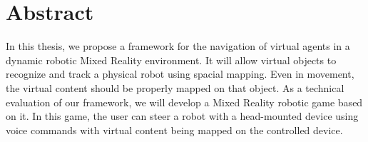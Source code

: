 \section*{Abstract}
In this thesis, we propose a framework for the navigation of virtual agents in a dynamic robotic Mixed Reality environment. It will allow virtual objects to recognize and track a physical robot using spacial mapping. Even in movement, the virtual content should be properly mapped on that object. As a technical evaluation of our framework, we will develop a Mixed Reality robotic game based on it. In this game, the user can steer a robot with a head-mounted device using voice commands with virtual content being mapped on the controlled device.   